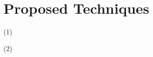 \section*{Proposed Techniques}

\begin{frame}{\CPDSearch{} (1)}
\end{frame}

\begin{frame}{\CPDSearch{} (2)}
\end{frame}